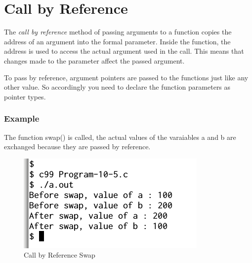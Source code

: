 \documentclass[11pt,a4paper]{article}
\begin{document}
\section*{Call by Reference}
The \emph{call by reference} method of passing arguments to a function copies the address of an argument into the formal parameter. Inside the function, the address is used to access the actual argument used in the call. This means that changes made to the parameter affect the passed argument.

To pass by reference, argument pointers are passed to the functions just like any other value. So accordingly you need to declare the function parameters as pointer types.

\subsubsection*{Example}



The function swap() is called, the actual values of the varaiables a and b are exchanged because they are passed by reference.

\begin{figure}[ht]
\begin{center}
\includegraphics[scale=0.6]{Output-10-5.png}
\caption{Call by Reference Swap}
\label{output-10-5}
\end{center}
\end{figure}
\end{document}
